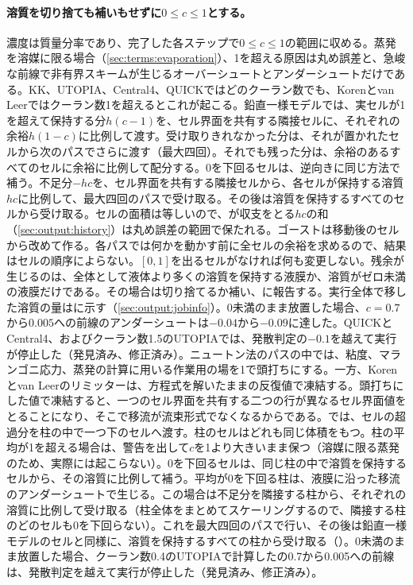 \paragraph{溶質を切り捨ても補いもせずに$0 \le c \le 1$とする。}濃度は質量分率であり、完了した各ステップで$0 \le c \le 1$の範囲に収める。蒸発を溶媒に限る場合（\cref{sec:terms:evaporation}）、1を超える原因は丸め誤差と、急峻な前線で非有界スキームが生じるオーバーシュートとアンダーシュートだけである。KK、UTOPIA、Central4、QUICKではどのクーラン数でも、Korenとvan Leerではクーラン数1を超えるとこれが起こる。鉛直一様モデルでは、実セルが1を超えて保持する分$h(c-1)$を、セル界面を共有する隣接セルに、それぞれの余裕$h(1-c)$に比例して渡す。受け取りきれなかった分は、それが置かれたセルから次のパスでさらに渡す（最大四回）。それでも残った分は、余裕のあるすべてのセルに余裕に比例して配分する。0を下回るセルは、逆向きに同じ方法で補う。不足分$-hc$を、セル界面を共有する隣接セルから、各セルが保持する溶質$hc$に比例して、最大四回のパスで受け取る。その後は溶質を保持するすべてのセルから受け取る。セルの面積は等しいので、が収支をとる$hc$の和（\cref{sec:output:history}）は丸め誤差の範囲で保たれる。ゴーストは移動後のセルから改めて作る。各パスでは何かを動かす前に全セルの余裕を求めるので、結果はセルの順序によらない。$[0, 1]$を出るセルがなければ何も変更しない。残余が生じるのは、全体として液体より多くの溶質を保持する液膜か、溶質がゼロ未満の液膜だけである。その場合は切り捨てるか補い、に報告する。実行全体で移した溶質の量はに示す（\cref{sec:output:jobinfo}）。0未満のまま放置した場合、$c = 0.7$から$0.005$への前線のアンダーシュートは$-0.04$から$-0.09$に達した。QUICKとCentral4、およびクーラン数1.5のUTOPIAでは、発散判定の$-0.1$を越えて実行が停止した（発見済み、修正済み）。ニュートン法のパスの中では、粘度、マランゴニ応力、蒸発の計算に用いる作業用の場を1で頭打ちにする。一方、Korenとvan Leerのリミッターは、方程式を解いたままの反復値で凍結する。頭打ちにした値で凍結すると、一つのセル界面を共有する二つの行が異なるセル界面値をとることになり、そこで移流が流束形式でなくなるからである。では、セルの超過分を柱の中で一つ下のセルへ渡す。柱のセルはどれも同じ体積をもつ。柱の平均が1を超える場合は、警告を出して$c$を1より大きいまま保つ（溶媒に限る蒸発のため、実際には起こらない）。0を下回るセルは、同じ柱の中で溶質を保持するセルから、その溶質に比例して補う。平均が0を下回る柱は、液膜に沿った移流のアンダーシュートで生じる。この場合は不足分を隣接する柱から、それぞれの溶質に比例して受け取る（柱全体をまとめてスケーリングするので、隣接する柱のどのセルも0を下回らない）。これを最大四回のパスで行い、その後は鉛直一様モデルのセルと同様に、溶質を保持するすべての柱から受け取る（）。0未満のまま放置した場合、クーラン数0.4のUTOPIAで計算したの0.7から0.005への前線は、発散判定を越えて実行が停止した（発見済み、修正済み）。

